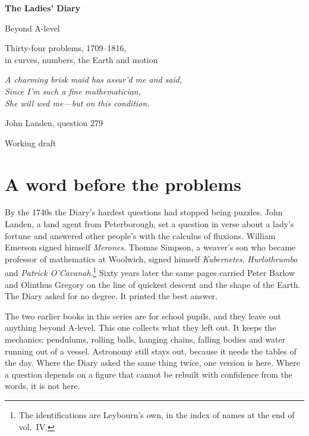 \documentclass[11pt,a4paper]{article}
\newcounter{prob}
\begin{document}
\begin{titlepage}
\centering
\vspace*{3cm}
{\Huge\bfseries The Ladies' Diary\par}
\vspace{0.4cm}
{\LARGE Beyond A-level\par}
\vspace{0.8cm}
{\Large Thirty-four problems, 1709--1816,\\ in curves, numbers, the Earth and motion\par}
\vspace{2cm}
{\large\itshape A charming brisk maid has assur'd me and said,\\
Since I'm such a fine mathematician,\\
She will wed me---but on this condition.\par}
\vspace{0.3cm}
{\small John Landen, question 279\par}
\vfill
{\large Working draft\par}
\end{titlepage}

\section*{A word before the problems}

By the 1740s the Diary's hardest questions had stopped being puzzles. John Landen, a
land agent from Peterborough, set a question in verse about a lady's fortune and answered
other people's with the calculus of fluxions. William Emerson signed himself
\textit{Merones}. Thomas Simpson, a weaver's son who became professor of mathematics at
Woolwich, signed himself \textit{Kubernetes}, \textit{Hurlothrumbo} and \textit{Patrick
O'Cavanah}.\footnote{The identifications are Leybourn's own, in the index of names at the
end of vol.~IV.} Sixty years later the same pages carried Peter Barlow and Olinthus
Gregory on the line of quickest descent and the shape of the Earth. The Diary asked for no
degree. It printed the best answer.

The two earlier books in this series are for school pupils, and they leave out anything
beyond A-level. This one collects what they left out. It keeps the mechanics:
pendulums, rolling balls, hanging chains, falling bodies and water running out of a
vessel. Astronomy still stays out, because it needs the tables of the day. Where the
Diary asked the same thing twice, one version is here. Where a question depends on a
figure that cannot be rebuilt with confidence from the words, it is not here.
\end{document}

